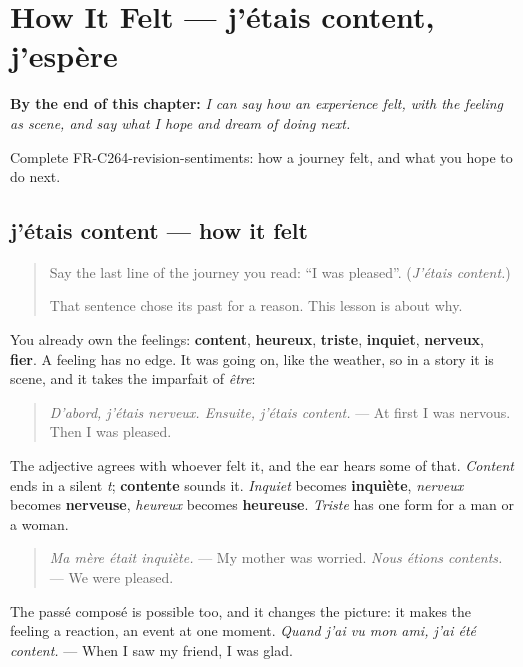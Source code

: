 
\chapter{How It Felt — j'étais content, j'espère}
\label{ch:fr-how-it-felt}

\begin{chapteropening}
\textbf{By the end of this chapter:} \emph{I can say how an experience felt, with the feeling as scene, and say what I hope and dream of doing next.}

Complete FR-C264-revision-sentiments: how a journey felt, and what you hope to do next.
\end{chapteropening}

\section[j'étais content, j'étais inquiet]{j'étais content — how it felt}

\label{lesson:FR-C264-jetais-content}



\begin{quote}
Say the last line of the journey you read: \textquotedblleft{}I was pleased\textquotedblright{}. (\emph{J'étais content.})

That sentence chose its past for a reason. This lesson is about why.
\end{quote}

\begin{grammarlens}[title={Grammar Lens: a feeling is scene}]
You already own the feelings: \textbf{content}, \textbf{heureux}, \textbf{triste}, \textbf{inquiet}, \textbf{nerveux}, \textbf{fier}. A feeling has no edge. It was going on, like the weather, so in a story it is scene, and it takes the imparfait of \emph{être}:

\begin{quote}
\emph{D'abord, j'étais nerveux. Ensuite, j'étais content.} — At first I was nervous. Then I was pleased.
\end{quote}

The adjective agrees with whoever felt it, and the ear hears some of that. \emph{Content} ends in a silent \emph{t}; \textbf{contente} sounds it. \emph{Inquiet} becomes \textbf{inquiète}, \emph{nerveux} becomes \textbf{nerveuse}, \emph{heureux} becomes \textbf{heureuse}. \emph{Triste} has one form for a man or a woman.

\begin{quote}
\emph{Ma mère était inquiète.} — My mother was worried. \emph{Nous étions contents.} — We were pleased.
\end{quote}

The passé composé is possible too, and it changes the picture: it makes the feeling a reaction, an event at one moment. \emph{Quand j'ai vu mon ami, j'ai été content.} — When I saw my friend, I was glad.
\end{grammarlens}

